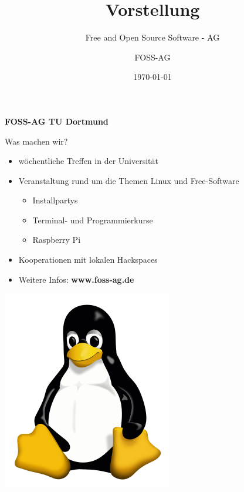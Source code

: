 \documentclass{beamer}
\author{FOSS-AG}
\date{\today}
\title{Vorstellung}
\subtitle{\textcolor{black}{F}ree and \textcolor{black}{O}pen \textcolor{black}{S}ource \textcolor{black}{S}oftware \textcolor{black}{- AG}}
\begin{document}
	
	\begin{frame}
		\begin{center}
		{\large \textbf{FOSS-AG TU Dortmund}}
		\end{center}
	
		\vspace{0.2cm}
		\begin{minipage}{0.56\linewidth}
			Was machen wir?
			\begin{itemize}
				\item wöchentliche Treffen in der Universität
				\item Veranstaltung rund um die Themen Linux und Free-Software
				\begin{itemize}
					\item Installpartys
					\item Terminal- und Programmierkurse
					\item Raspberry Pi
				\end{itemize}
				\item Kooperationen mit lokalen Hackspaces
				\item Weitere Infos: \textbf{www.foss-ag.de}
			\end{itemize}
		\end{minipage}
	
		\hspace*{0.8\linewidth}
		\begin{minipage}{0.35\linewidth}
			\includegraphics[scale=0.2]{tux}
		\end{minipage}
	\end{frame}
\end{document}
